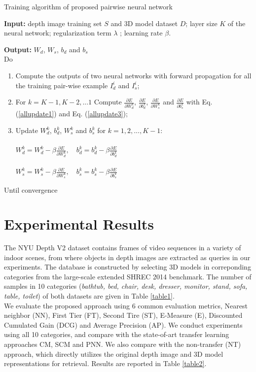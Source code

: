 \documentclass{article}
\begin{document}
\begin{algorithm}
\caption {Training algorithm of proposed pairwise neural network}
\label{algorithm: 001}
\textbf{Input:} depth image training set $S$ and 3D model  dataset $D$; layer size $K$ of the neural network; regularization term $\lambda$ ; learning rate $\beta$.

\textbf{Output:} $W_d$, $W_s$, $b_d$ and $b_s$\\

Do
\begin{enumerate}
	\item Compute the outputs of two neural networks with forward propagation for all the training pair-wise example $I^i_d$ and $I_s^i$;
 \item For $k=K-1,K-2,...1$
	Compute $\frac{\partial E}{\partial W_d^k}$, $\frac{\partial E}{\partial b_d^k}$, $\frac{\partial E}{\partial W_s^k}$ and $\frac{\partial E}{\partial b_s^k}$ with Eq.(\ref{allupdate1}) and Eq. (\ref{allupdate3});
\item Update $W_d^k$, $b_d^k$, $W_s^k$ and $b_s^k$ for $k=1,2,...,K-1$:\\
\\
	$W_d^k = W_d^k - \beta \frac{\partial E}{\partial W_d^k},  \quad b_d^k = b_d^k - \beta \frac{\partial E}{\partial b_d^k}$	\\
\\
	$W_s^k = W_s^k - \beta \frac{\partial E}{\partial W_s^k},  \quad b_s^k = b_s^k - \beta \frac{\partial E}{\partial b_s^k}$
\\

\end{enumerate}
Until convergence
\end{algorithm}


\section{Experimental Results}
The NYU Depth V2 dataset contains frames of video sequences in a variety of indoor scenes, from where objects in depth images are extracted as queries in our experiments. The database is constructed by selecting 3D models in correponding categories from the large-scale extended SHREC 2014 benchmark. The number of samples in 10 categories ({\it bathtub, bed, chair, desk, dresser, monitor, stand, sofa, table, toilet}) of both datasets are given in Table \ref{table1}.
\\
We evaluate the proposed approach using 6 common evaluation metrics, Nearest neighbor (NN), First Tier (FT), Second Tire (ST), E-Measure (E), Discounted Cumulated Gain (DCG) and Average Precision (AP). We conduct experiments using all 10 categories, and compare with the state-of-art transfer learning approaches CM, SCM and PNN. We also compare with the non-transfer (NT) approach, which directly utilizes the original depth image and 3D model representations for retrieval. Results are reported in Table \ref{table2}.
\end{document}
